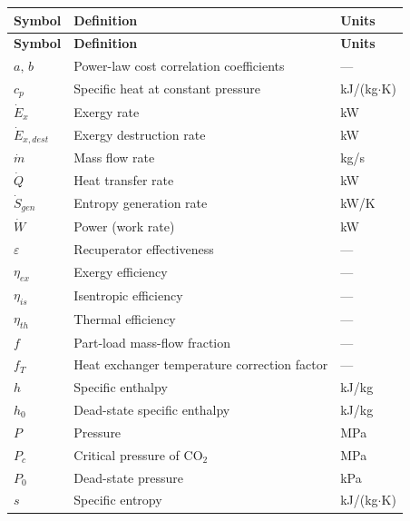 \documentclass[12pt,a4paper]{report}
\begin{document}
\begin{longtable}{p{2.8cm} p{7.5cm} p{3.0cm}}
\toprule
\textbf{Symbol} & \textbf{Definition} & \textbf{Units} \\
\midrule
\endfirsthead
\toprule
\textbf{Symbol} & \textbf{Definition} & \textbf{Units} \\
\midrule
\endhead
\bottomrule
\endlastfoot
$a,\,b$              & Power-law cost correlation coefficients    & --- \\
$c_p$                & Specific heat at constant pressure         & kJ/(kg$\cdot$K) \\
$\dot{E}_{x}$        & Exergy rate                                & kW \\
$\dot{E}_{x,dest}$   & Exergy destruction rate                    & kW \\
$\dot{m}$            & Mass flow rate                             & kg/s \\
$\dot{Q}$            & Heat transfer rate                         & kW \\
$\dot{S}_{gen}$      & Entropy generation rate                    & kW/K \\
$\dot{W}$            & Power (work rate)                          & kW \\
$\varepsilon$        & Recuperator effectiveness                  & --- \\
$\eta_{ex}$          & Exergy efficiency                          & --- \\
$\eta_{is}$          & Isentropic efficiency                      & --- \\
$\eta_{th}$          & Thermal efficiency                         & --- \\
$f$                  & Part-load mass-flow fraction               & --- \\
$f_T$                & Heat exchanger temperature correction factor & --- \\
$h$                  & Specific enthalpy                          & kJ/kg \\
$h_0$                & Dead-state specific enthalpy               & kJ/kg \\
$P$                  & Pressure                                   & MPa \\
$P_c$                & Critical pressure of CO$_2$                & MPa \\
$P_0$                & Dead-state pressure                        & kPa \\
$s$                  & Specific entropy                           & kJ/(kg$\cdot$K) \\

\end{longtable}
\end{document}
